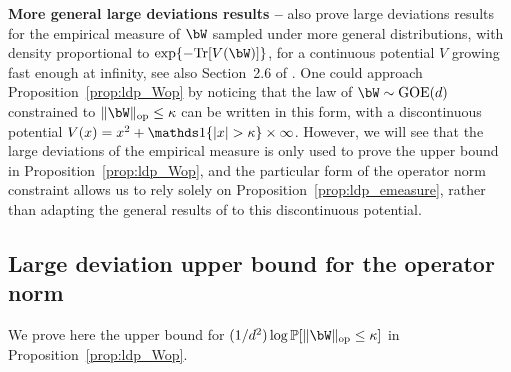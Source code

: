 \myskip
\textbf{More general large deviations results --}
\cite{arous1997large} also prove large deviations results for the empirical measure of $\bW$ sampled under more general distributions, with density 
proportional to $\exp\{-\Tr[V(\bW)]\}$, for a continuous potential $V$ growing fast enough at infinity, see also Section~2.6 of \cite{anderson2010introduction}. 
One could approach Proposition~\ref{prop:ldp_Wop} by noticing that
the law of $\bW \sim \GOE(d)$ constrained to $\|\bW\|_\op \leq \kappa$ can be written in this form, with a discontinuous potential
$V(x) = x^2 + \indi\{|x| > \kappa\} \times \infty$.
However, we will see that the large deviations of the empirical measure is only used to prove the upper bound in Proposition~\ref{prop:ldp_Wop}, 
and the particular form of the operator norm constraint allows us to rely solely on Proposition~\ref{prop:ldp_emeasure}, rather than 
adapting the general results of \cite{arous1997large,anderson2010introduction} to this discontinuous potential. 

\subsection{Large deviation upper bound for the operator norm}\label{subsec:ldp_Wop_ub}

We prove here the upper bound for $(1/d^2) \log \bbP[\|\bW\|_\op \leq \kappa]$ in Proposition~\ref{prop:ldp_Wop}.

